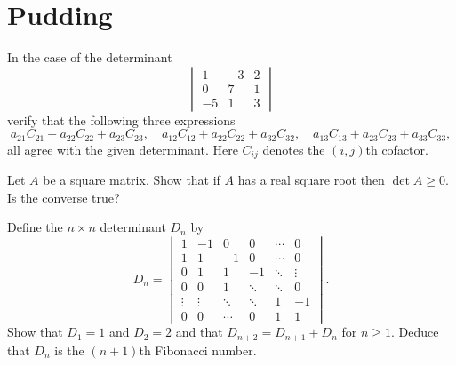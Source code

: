 \documentclass[answers]{exam}
\begin{document}
\section*{Pudding}
\begin{questions}

\question%
In the case of the determinant \[
	\begin{vmatrix}
		1 & -3 & 2 \\
		0 & 7 & 1 \\
		-5 & 1 & 3
	\end{vmatrix}
\] verify that the following three expressions \[
	a_{21} C_{21}+a_{22} C_{22}+a_{23} C_{23}, \quad a_{12} C_{12}+a_{22} C_{22}+a_{32} C_{32}, \quad a_{13} C_{13}+a_{23} C_{23}+a_{33} C_{33},
\] all agree with the given determinant. Here $C_{i j}$ denotes the $(i, j)$th cofactor.



\question%
Let $A$ be a square matrix. Show that if $A$ has a real square root then $\det A \geqslant 0$. Is the converse true?



\question%
Define the $n \times n$ determinant $D_{n}$ by \[
	D_{n}=\begin{vmatrix}
		1 & -1 & 0 & 0 & \cdots & 0 \\
		1 & 1 & -1 & 0 & \cdots & 0 \\
		0 & 1 & 1 & -1 & \ddots & \vdots \\
		0 & 0 & 1 & \ddots & \ddots & 0 \\
		\vdots & \vdots & \ddots & \ddots & 1 & -1 \\
		0 & 0 & \cdots & 0 & 1 & 1
	\end{vmatrix}.
\] Show that $D_{1}=1$ and $D_{2}=2$ and that $D_{n+2}=D_{n+1}+D_{n}$ for $n \geqslant 1$. Deduce that $D_{n}$ is the $(n+1)$th Fibonacci number.

\end{questions}
\end{document}
